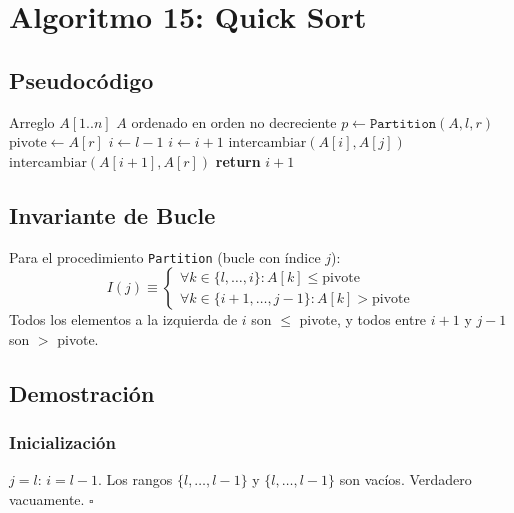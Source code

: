 \documentclass[11pt,a4paper]{article}
\newcommand{\inv}{I}
\begin{document}
\newpage

\section{Algoritmo 15: Quick Sort}

\subsection{Pseudocódigo}
\begin{algorithm}[H]
\caption{Quick Sort}
\begin{algorithmic}[1]
\Require Arreglo $A[1..n]$
\Ensure $A$ ordenado en orden no decreciente
        \State $p \gets \texttt{Partition}(A, l, r)$
        \State {}
        \State {}
    \EndIf
\EndProcedure
\Statex
{}
    \State $\text{pivote} \gets A[r]$
    \State $i \gets l - 1$
            \State $i \gets i + 1$
            \State $\text{intercambiar}(A[i], A[j])$
        \EndIf
    \EndFor
    \State $\text{intercambiar}(A[i+1], A[r])$
    \State \textbf{return} $i + 1$
\EndProcedure
\end{algorithmic}
\end{algorithm}

\subsection{Invariante de Bucle}

Para el procedimiento \texttt{Partition} (bucle con índice $j$):
\[
\boxed{\inv(j) \equiv \begin{cases}
\forall k \in \{l, \ldots, i\}: A[k] \leq \text{pivote}\\
\forall k \in \{i+1, \ldots, j-1\}: A[k] > \text{pivote}
\end{cases}}
\]
Todos los elementos a la izquierda de $i$ son $\leq$ pivote, y todos entre $i+1$ y $j-1$ son $>$ pivote.

\subsection{Demostración}

\subsubsection{Inicialización}
$j = l$: $i = l - 1$. Los rangos $\{l, \ldots, l-1\}$ y $\{l, \ldots, l-1\}$ son vacíos. Verdadero vacuamente. $\square$
\end{document}
